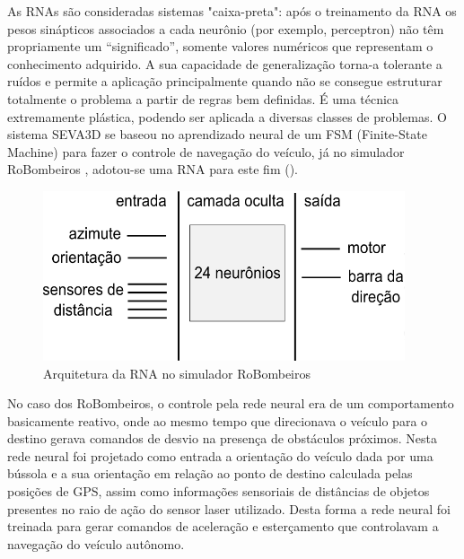 As RNAs são consideradas sistemas "caixa-preta": após o treinamento da RNA os
pesos sinápticos associados a cada neurônio (por exemplo, perceptron) não têm
propriamente um “significado”, somente valores numéricos que representam o
conhecimento adquirido. A sua capacidade de generalização torna-a tolerante a
ruídos e permite a aplicação principalmente quando não se consegue estruturar
totalmente o problema a partir de regras bem definidas. É uma técnica
extremamente plástica, podendo ser aplicada a diversas classes de problemas. O
sistema SEVA3D \cite{Heinen2007} se baseou no aprendizado neural de um FSM
(Finite-State Machine) para fazer o controle de navegação do veículo, já no
simulador RoBombeiros \cite{Pessin2008}, adotou-se uma RNA para este fim
().

\vspace{0.5cm}
\begin{figure}[ht]
	\centering
	\begin{minipage}[b]{0.6\linewidth}
	    \centering
	 	\includegraphics[width=\textwidth,height=5cm]{images/ann_pesin.png}
	 	\caption{Arquitetura da RNA no simulador RoBombeiros}
	 	\label{fig:ann_pesin}
	\end{minipage}
\end{figure}



No caso dos RoBombeiros, o controle pela rede neural era de um comportamento
basicamente reativo, onde ao mesmo tempo que direcionava o veículo para o
destino gerava comandos de desvio na presença de obstáculos próximos. Nesta rede
neural foi projetado como entrada a orientação do veículo dada por uma bússola e
a sua orientação em relação ao ponto de destino calculada pelas posições de GPS,
assim como informações sensoriais de distâncias de objetos presentes no raio de
ação do sensor laser utilizado. Desta forma a rede neural foi treinada para
gerar comandos de aceleração e esterçamento que controlavam a navegação do
veículo autônomo.

